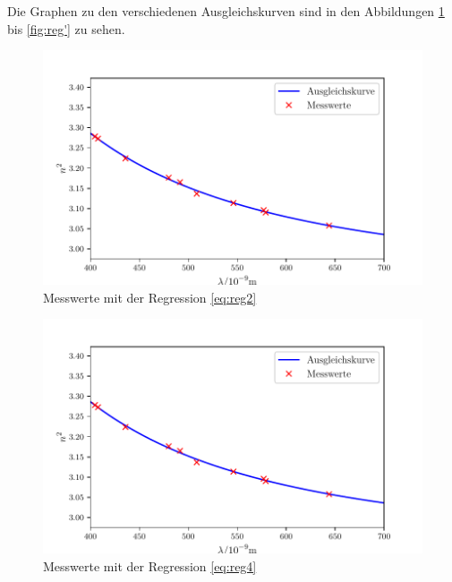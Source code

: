 Die Graphen zu den verschiedenen Ausgleichskurven sind in den Abbildungen \ref{fig:reg2} bis \ref{fig:reg'} zu sehen.

\begin{figure}
\centering
\includegraphics[scale=0.5]{content/images/Graph11.pdf}
\caption{Messwerte mit der Regression \eqref{eq:reg2}}
\label{fig:reg2}
\end{figure}

\begin{figure}
\centering
\includegraphics[scale=0.5]{content/images/Graph11.4.pdf}
\caption{Messwerte mit der Regression \eqref{eq:reg4}}
\end{figure}

